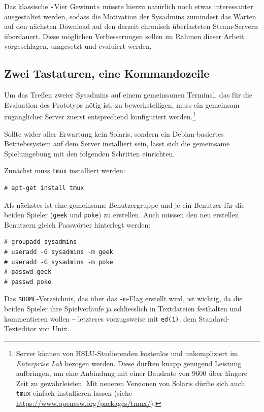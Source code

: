 \documentclass[a4paper,11pt,hidelinks]{scrartcl}
\begin{document}
Das klassische «Vier Gewinnt» müsste hierzu natürlich noch etwas interessanter ausgestaltet werden, sodass die Motivation der Sysadmins zumindest das Warten auf den nächsten Download auf den derzeit chronisch überlasteten Steam-Servern überdauert. Diese möglichen Verbesserungen sollen im Rahmen dieser Arbeit vorgeschlagen, umgesetzt und evaluiert werden.

\subsection{Zwei Tastaturen, eine Kommandozeile}

Um das Treffen zweier Sysadmins auf einem gemeinsamen Terminal, das für die Evaluation des Prototyps nötig ist, zu bewerkstelligen, muss ein gemeinsam zugänglicher Server zuerst entsprechend konfiguriert werden.\footnote{Server können von HSLU-Studierenden kostenlos und unkompliziert im \textit{Enterprise Lab} bezogen werden. Diese dürften knapp genügend Leistung aufbringen, um eine Anbindung mit einer Baudrate von 9600 über längere Zeit zu gewährleisten. Mit neueren Versionen von Solaris dürfte sich auch \texttt{tmux} einfach installieren lassen (siehe \url{https://www.opencsw.org/packages/tmux/}).}

Sollte wider aller Erwartung kein Solaris, sondern ein Debian-basiertes Betriebssystem auf dem Server installiert sein, lässt sich die gemeinsame Spielumgebung mit den folgenden Schritten einrichten.

Zunächst muss \texttt{tmux} installiert werden:

\begin{lstlisting}
# apt-get install tmux
\end{lstlisting}

Als nächstes ist eine gemeinsame Benutzergruppe und je ein Benutzer für die beiden Spieler (\texttt{geek} und \texttt{poke}) zu erstellen. Auch müssen den neu erstellen Benutzern gleich Passwörter hinterlegt werden:

\begin{lstlisting}
# groupadd sysadmins
# useradd -G sysadmins -m geek
# useradd -G sysadmins -m poke
# passwd geek
# passwd poke
\end{lstlisting}

Das \texttt{\$HOME}-Verzeichnis, das über das \texttt{-m}-Flag erstellt wird, ist wichtig, da die beiden Spieler ihre Spielverläufe ja schliesslich in Textdateien festhalten und kommentieren wollen ‒ letzteres vorzugsweise mit \texttt{ed(1)}, dem Standard-Texteditor von Unix.
\end{document}
